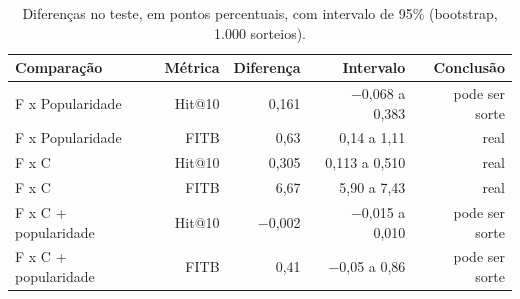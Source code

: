 \begin{table}[t]
\centering
\caption{Diferenças no teste, em pontos percentuais, com intervalo de 95\% (bootstrap, 1.000 sorteios).}
\label{tab:diferencas}
\footnotesize
\begin{tabular}{lrrrr}
\toprule
Comparação & Métrica & Diferença & Intervalo & Conclusão \\
\midrule
F x Popularidade & Hit@10 & 0,161 & $-$0,068 a 0,383 & pode ser sorte \\
F x Popularidade & FITB & 0,63 & 0,14 a 1,11 & real \\
F x C & Hit@10 & 0,305 & 0,113 a 0,510 & real \\
F x C & FITB & 6,67 & 5,90 a 7,43 & real \\
F x C + popularidade & Hit@10 & $-$0,002 & $-$0,015 a 0,010 & pode ser sorte \\
F x C + popularidade & FITB & 0,41 & $-$0,05 a 0,86 & pode ser sorte \\
\bottomrule
\end{tabular}
\end{table}
